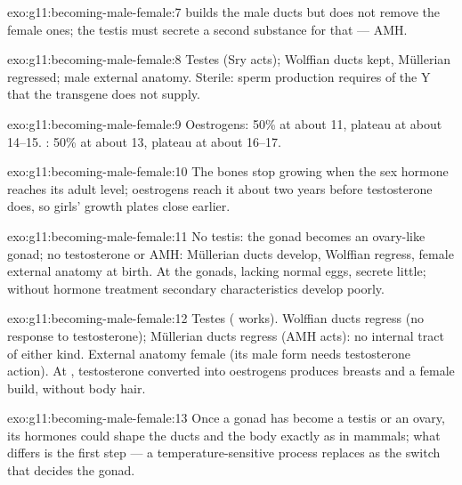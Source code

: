 \begin{solution}{exo:g11:becoming-male-female:7}
 builds the male ducts but does not remove the female
ones; the testis must secrete a second substance for that --- AMH.
\end{solution}

\begin{solution}{exo:g11:becoming-male-female:8}
Testes (Sry acts); Wolffian ducts kept, Müllerian regressed; male
external anatomy. Sterile: sperm production requires  of the Y
that the transgene does not supply.
\end{solution}

\begin{solution}{exo:g11:becoming-male-female:9}
Oestrogens: 50\% at about 11, plateau at about 14--15. :
50\% at about 13, plateau at about 16--17.
\end{solution}

\begin{solution}{exo:g11:becoming-male-female:10}
The bones stop growing when the sex hormone reaches its adult level;
oestrogens reach it about two years before testosterone does, so
girls' growth plates close earlier.
\end{solution}

\begin{solution}{exo:g11:becoming-male-female:11}
No testis: the gonad becomes an ovary-like gonad; no testosterone or
AMH: Müllerian ducts develop, Wolffian regress, female external
anatomy at birth. At  the gonads, lacking normal eggs, secrete
little; without hormone treatment secondary characteristics develop
poorly.
\end{solution}

\begin{solution}{exo:g11:becoming-male-female:12}
Testes ( works). Wolffian ducts regress (no response to
testosterone); Müllerian ducts regress (AMH acts): no internal tract
of either kind. External anatomy female (its male form needs
testosterone action). At , testosterone converted into
oestrogens produces breasts and a female build, without body hair.
\end{solution}

\begin{solution}{exo:g11:becoming-male-female:13}
Once a gonad has become a testis or an ovary, its hormones could shape
the ducts and the body exactly as in mammals; what differs is the
first step --- a temperature-sensitive process replaces  as the
switch that decides the gonad.
\end{solution}

